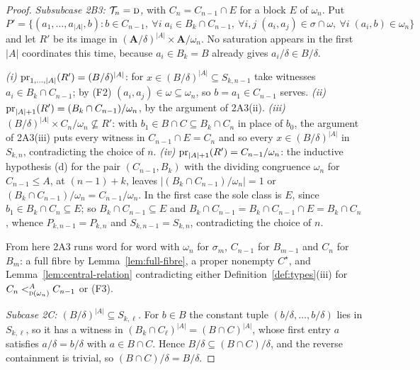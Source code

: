 \begin{proof}
\emph{Subsubcase 2B3: $\mathcal T_{n}=\TD$,} with $C_{n}=C_{n-1}\cap E$ for a
block $E$ of $\omega_{n}$. Put
\[
  P'=\bigl\{(a_{1},\dots,a_{|A|},b): b\in C_{n-1},\ \forall i\;
    a_{i}\in B_{k}\cap C_{n-1},\ \forall i,j\;(a_{i},a_{j})\in\sigma\cap\omega,
    \ \forall i\;(a_{i},b)\in\omega_{n}\bigr\}
\]
and let $R'$ be its image in $(\mathbf A/\delta)^{|A|}\times\mathbf A/
\omega_{n}$. No saturation appears in the first $|A|$ coordinates this time,
because $a_{i}\in B_{k}=B$ already gives $a_{i}/\delta\in B/\delta$.

\emph{(i)} $\proj_{1,\dots,|A|}(R')=(B/\delta)^{|A|}$: for
$x\in(B/\delta)^{|A|}\subseteq S_{k,n-1}$ take witnesses $a_{i}\in B_{k}\cap
C_{n-1}$; by (F2) $(a_{i},a_{j})\in\omega\subseteq\omega_{n}$, so
$b=a_{1}\in C_{n-1}$ serves.
\emph{(ii)} $\proj_{|A|+1}(R')=(B_{k}\cap C_{n-1})/\omega_{n}$, by the
argument of 2A3(ii).
\emph{(iii)} $(B/\delta)^{|A|}\times C_{n}/\omega_{n}\not\subseteq R'$: with
$b_{1}\in B\cap C\subseteq B_{k}\cap C_{n}$ in place of $b_{0}$, the argument
of 2A3(iii) puts every witness in $C_{n-1}\cap E=C_{n}$ and so every
$x\in(B/\delta)^{|A|}$ in $S_{k,n}$, contradicting the choice of $n$.
\emph{(iv)} $\proj_{|A|+1}(R')=C_{n-1}/\omega_{n}$: the inductive hypothesis
(d) for the pair $(C_{n-1},B_{k})$ with the dividing congruence $\omega_{n}$
for $C_{n-1}\le A$, at $(n-1)+k$, leaves $|(B_{k}\cap C_{n-1})/\omega_{n}|=1$
or $(B_{k}\cap C_{n-1})/\omega_{n}=C_{n-1}/\omega_{n}$. In the first case the
sole class is $E$, since $b_{1}\in B_{k}\cap C_{n}\subseteq E$; so
$B_{k}\cap C_{n-1}\subseteq E$ and $B_{k}\cap C_{n-1}=B_{k}\cap C_{n-1}\cap
E=B_{k}\cap C_{n}$, whence $P_{k,n-1}=P_{k,n}$ and $S_{k,n-1}=S_{k,n}$,
contradicting the choice of $n$.

From here 2A3 runs word for word with $\omega_{n}$ for $\sigma_{m}$,
$C_{n-1}$ for $B_{m-1}$ and $C_{n}$ for $B_{m}$: a full fibre by
Lemma~\ref{lem:full-fibre}, a proper
nonempty $C^{\star}$, and Lemma~\ref{lem:central-relation} contradicting either
Definition~\ref{def:types}(iii) for $C_{n}\subt[A]{\TD(\omega_{n})}C_{n-1}$ or
(F3).

\emph{Subcase 2C: $(B/\delta)^{|A|}\subseteq S_{k,\ell}$.} For $b\in B$ the
constant tuple $(b/\delta,\dots,b/\delta)$ lies in $S_{k,\ell}$, so it has a
witness in $(B_{k}\cap C_{\ell})^{|A|}=(B\cap C)^{|A|}$, whose first entry $a$
satisfies $a/\delta=b/\delta$ with $a\in B\cap C$. Hence $B/\delta\subseteq
(B\cap C)/\delta$, and the reverse containment is trivial, so
$(B\cap C)/\delta=B/\delta$.
\end{proof}

